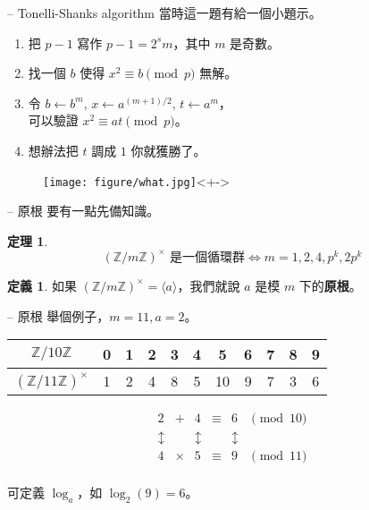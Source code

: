 \documentclass[notheorems,xcolor=dvipsnames]{beamer}
\newcommand*{\bZ}{\mathbb{Z}}
\theoremstyle{definition}
\newtheorem{theorem}{定理}
\newtheorem{definition}{定義}
\renewcommand*{\emph}[1]{{\bf #1}}
\begin{document}
\begin{frame}[t]{{\secname} -- Tonelli-Shanks algorithm}
  當時這一題有給一個小題示。

  \begin{enumerate}
    \item 把 $p-1$ 寫作 $p-1 = 2^s m$，其中 $m$ 是奇數。
    \item 找一個 $b$ 使得 $x^2 \equiv b \pmod{p}$ 無解。
    \item 令 $b \gets b^m,\, x \gets a^{(m+1)/2},\, t \gets a^m$，\\
      可以驗證 $x^2 \equiv at \pmod{p}$。
    \item 想辦法把 $t$ 調成 $1$ 你就獲勝了。
  \end{enumerate}
  \pause

  \begin{figure}
    \centering
    \texttt{[image: figure/what.jpg]}<+->
  \end{figure}
\end{frame}

\begin{frame}{{\secname} -- 原根}
  要有一點先備知識。\pause

  \bigskip
  \begin{theorem}
    \vspace{-1em}
    \[ (\bZ / m\bZ)^{\times} \text{ 是一個循環群} \iff m = 1, 2, 4, p^k, 2p^k \]
  \end{theorem}
  \pause

  \bigskip
  \begin{definition}
    如果 $(\bZ / m\bZ)^{\times} = \langle a \rangle$，我們就說 $a$ 是模 $m$ 下的\emph{原根}。
  \end{definition}
\end{frame}

\begin{frame}{{\secname} -- 原根}
  舉個例子，$m = 11, a = 2$。
  \begin{table}
    \begin{tabular}{c||c|c|c|c|c|c|c|c|c|c}
      $\bZ / 10\bZ$
      & 0 & 1 & 2 & 3 & 4 & 5 & 6 & 7 & 8 & 9 \\
      \hline
      $(\bZ / 11\bZ)^{\times}$
      & 1 & 2 & 4 & 8 & 5 & 10 & 9 & 7 & 3 & 6 \\
    \end{tabular}
  \end{table}
  \pause

  \[
    \begin{array}{cccccl}
      2 & +      & 4 & \equiv & 6 & \pmod{10} \\
      \updownarrow & & \updownarrow & & \updownarrow & \\
      4 & \times & 5 & \equiv & 9 & \pmod{11} \\
    \end{array}
  \]
  \pause

  可定義 $\log_a$，如 $\log_2(9) = 6$。
\end{frame}
\end{document}
